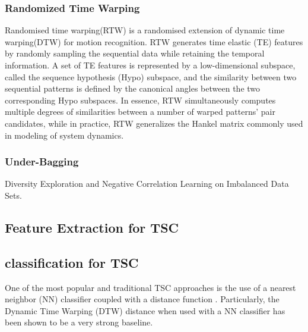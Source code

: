 \subsubsection{Randomized Time Warping}
Randomised time warping(RTW) is a randomised extension of dynamic time warping(DTW) for motion recognition\cite{suryanto2016randomized}. RTW generates time elastic (TE) features by randomly sampling the sequential data while retaining the temporal information. A set of TE features is represented by a low-dimensional subspace, called the sequence hypothesis (Hypo) subspace, and the similarity between two sequential patterns is defined by the canonical angles between the two corresponding Hypo subspaces. In essence, RTW simultaneously computes multiple degrees of similarities between a number of warped patterns’ pair candidates, while in practice, RTW generalizes the Hankel matrix commonly used in modeling of system dynamics. 


\subsubsection{Under-Bagging}
Diversity Exploration and Negative Correlation Learning on Imbalanced Data Sets.

\subsection{Feature Extraction for TSC}

\subsection{classification for TSC}
One of the most popular and traditional TSC approaches is the use of a nearest neighbor (NN) classifier coupled with a distance function \cite{bagnall2017great}. Particularly, the Dynamic Time Warping (DTW) distance when used with a NN classifier has been shown to be a very strong baseline\cite{lines2015time}.

